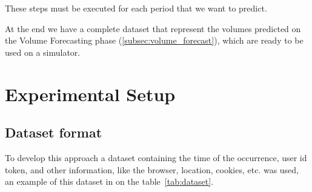 These steps must be executed for each period that we want to predict.

At the end we have a complete dataset that represent the volumes predicted on
the Volume Forecasting phase (\ref{subsec:volume_forecast}), which are ready to be used on a simulator.

\section{Experimental Setup}

\subsection{Dataset format}

To develop this approach a dataset containing the time of the occurrence, user
id token, and other information, like the browser, location, cookies, etc. was
used, an example of this dataset in on the table~\ref{tab:dataset}.

